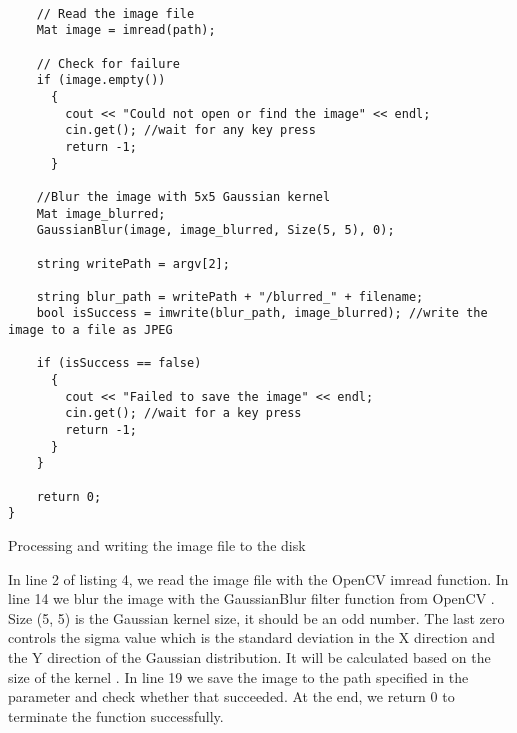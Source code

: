 \begin{listing}[ht]
\begin{verbatim}

    // Read the image file
    Mat image = imread(path);

    // Check for failure
    if (image.empty())
      {
        cout << "Could not open or find the image" << endl;
        cin.get(); //wait for any key press
        return -1;
      }

    //Blur the image with 5x5 Gaussian kernel
    Mat image_blurred;
    GaussianBlur(image, image_blurred, Size(5, 5), 0);

    string writePath = argv[2];

    string blur_path = writePath + "/blurred_" + filename;
    bool isSuccess = imwrite(blur_path, image_blurred); //write the image to a file as JPEG

    if (isSuccess == false)
      {
        cout << "Failed to save the image" << endl;
        cin.get(); //wait for a key press
        return -1;
      }
    }

    return 0;
}
\end{verbatim}
\caption{Processing and writing the image file to the disk}
\label{listing:c++-write}
\end{listing}

In line 2 of listing 4, we read the image file with the OpenCV imread function. In line 14 we blur the image with the GaussianBlur filter function from OpenCV \cite{gaussianblur}. Size (5, 5) is the Gaussian kernel size, it should be an odd number. The last zero controls the sigma value which is the standard deviation in the X direction and the Y direction of the Gaussian distribution. It will be calculated based on the size of the kernel \cite{gaussianblurtutorial}. In line 19 we save the image to the path specified in the parameter and check whether that succeeded. At the end, we return 0 to terminate the function successfully.

